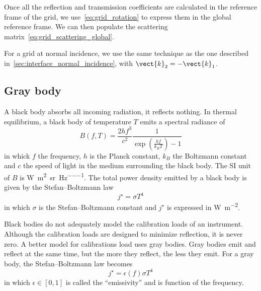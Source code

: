 Once all the reflection and transmission coefficients are calculated in the reference frame of the grid, we use~\cref{eq:grid_rotation} to express them in the global reference frame.
We can then populate the scattering matrix~\cref{eq:grid_scattering_global}.

For a grid at normal incidence, we use the same technique as the one described in~\vref{sec:interface_normal_incidence}, \textit{} with $\vect{k}_2=-\vect{k}_1$.





\subsection{Gray body}
\label{sec:gray_body}
A black body absorbs all incoming radiation, it reflects nothing.
In thermal equilibrium, a black body of temperature $T$ emits a spectral radiance of
\begin{equation}
    B(f, T) =
    \frac{2 h f^3}{c^2}
    \frac{1}{
        \exp \left(
            \frac{h f}{k_B T}
        \right)
        -1
    }
\end{equation}
in whick $f$ the frequency, $h$ is the Planck constant, $k_B$ the Boltzmann constant and $c$ the speed of light in the medium surrounding the black body.
The SI unit of $B$ is \si{\watt\per\meter\squared\per\steradian\per\hertz}.
The total power density emitted by a black body is given by the Stefan--Boltzmann law
\begin{equation}
    j^\star = \sigma T^4
\end{equation}
in which $\sigma$ is the Stefan--Boltzmann constant and
$j^\star$ is expressed in \si{\watt\per\meter\squared}.

Black bodies do not adequately model the calibration loads of an instrument.
Although the calibration loads are designed to minimize reflection, it is never zero.
A better model for calibrations load uses gray bodies.
Gray bodies emit and reflect at the same time,
but the more they reflect, the less they emit.
For a gray body, the Stefan--Boltzmann law becomes
\begin{equation}
    j^\star = \epsilon(f) \sigma T^4
\end{equation}
in which $\epsilon \in [0,1]$ is called the ``emissivity'' and is function of the frequency.

